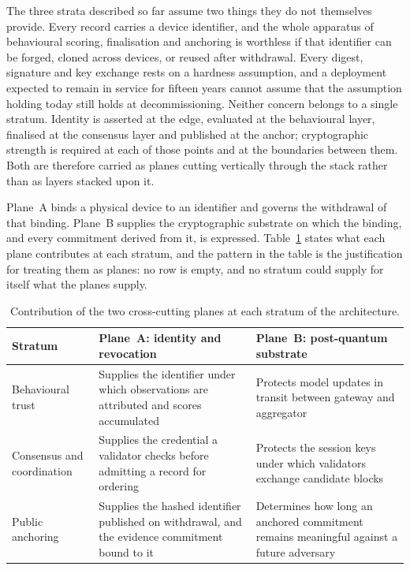 The three strata described so far assume two things they do not themselves provide. Every record carries a device identifier, and the whole apparatus of behavioural scoring, finalisation and anchoring is worthless if that identifier can be forged, cloned across devices, or reused after withdrawal. Every digest, signature and key exchange rests on a hardness assumption, and a deployment expected to remain in service for fifteen years cannot assume that the assumption holding today still holds at decommissioning. Neither concern belongs to a single stratum. Identity is asserted at the edge, evaluated at the behavioural layer, finalised at the consensus layer and published at the anchor; cryptographic strength is required at each of those points and at the boundaries between them. Both are therefore carried as planes cutting vertically through the stack rather than as layers stacked upon it.

Plane~A binds a physical device to an identifier and governs the withdrawal of that binding. Plane~B supplies the cryptographic substrate on which the binding, and every commitment derived from it, is expressed. Table~\ref{tab:planes-matrix} states what each plane contributes at each stratum, and the pattern in the table is the justification for treating them as planes: no row is empty, and no stratum could supply for itself what the planes supply.

\begin{table}[!htbp]
  \centering
  \footnotesize
  \setlength{\tabcolsep}{5pt}
  \renewcommand{\arraystretch}{1.3}
  \caption{Contribution of the two cross-cutting planes at each stratum of the architecture.}
  \label{tab:planes-matrix}
  \begin{tabularx}{\textwidth}{@{}
      >{\raggedright\arraybackslash}p{3.0cm}
      >{\raggedright\arraybackslash}X
      >{\raggedright\arraybackslash}X@{}}
    \toprule
    \textbf{Stratum} & \textbf{Plane~A: identity and revocation} & \textbf{Plane~B: post-quantum substrate} \\
    \midrule
    Behavioural trust
      & Supplies the identifier under which observations are attributed and scores accumulated
      & Protects model updates in transit between gateway and aggregator \\
    Consensus and coordination
      & Supplies the credential a validator checks before admitting a record for ordering
      & Protects the session keys under which validators exchange candidate blocks \\
    Public anchoring
      & Supplies the hashed identifier published on withdrawal, and the evidence commitment bound to it
      & Determines how long an anchored commitment remains meaningful against a future adversary \\
    \bottomrule
  \end{tabularx}
\end{table}

